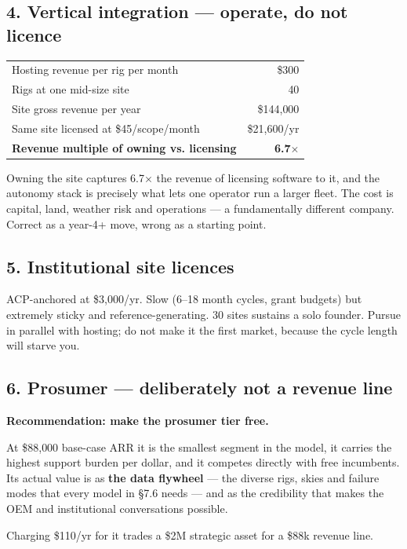 \documentclass[11pt]{article}
\newcommand{\dollar}[1]{\$#1}
\begin{document}
\subsection{4. Vertical integration --- operate, do not licence}

\begin{center}
\small
\begin{tabular}{@{}lr@{}}
\toprule
Hosting revenue per rig per month & \dollar{300} \\
Rigs at one mid-size site & 40 \\
Site gross revenue per year & \dollar{144{,}000} \\
Same site licensed at \dollar{45}/scope/month & \dollar{21{,}600}/yr \\
\midrule
\textbf{Revenue multiple of owning vs. licensing} & \textbf{6.7$\times$} \\
\bottomrule
\end{tabular}
\end{center}

\vspace{0.3em}
Owning the site captures 6.7$\times$ the revenue of licensing software to it,
and the autonomy stack is precisely what lets one operator run a larger fleet.
The cost is capital, land, weather risk and operations --- a fundamentally
different company. Correct as a year-4+ move, wrong as a starting point.

\subsection{5. Institutional site licences}

ACP-anchored at \dollar{3{,}000}/yr. Slow (6--18 month cycles, grant budgets)
but extremely sticky and reference-generating. 30 sites sustains a solo founder.
Pursue in parallel with hosting; do not make it the first market, because the
cycle length will starve you.

\subsection{6. Prosumer --- deliberately not a revenue line}

\begin{keybox}
\textbf{Recommendation: make the prosumer tier free.}

At \dollar{88{,}000} base-case ARR it is the smallest segment in the model, it
carries the highest support burden per dollar, and it competes directly with
free incumbents. Its actual value is as \textbf{the data flywheel} --- the
diverse rigs, skies and failure modes that every model in §7.6 needs --- and as
the credibility that makes the OEM and institutional conversations possible.

Charging \dollar{110}/yr for it trades a \dollar{2}M strategic asset for a
\dollar{88}k revenue line.
\end{keybox}
\end{document}
